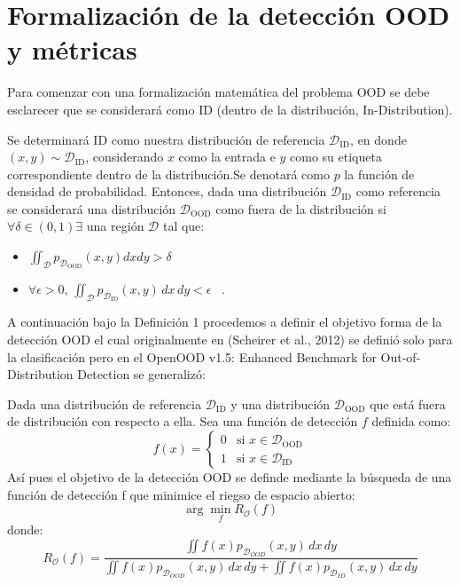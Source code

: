 %

\chapter{Formalización de la detección OOD y métricas}\label{cap:ood-metricas}
Para comenzar con una formalización matemática del problema OOD se debe esclarecer que se considerará como ID (dentro de la distribución, In-Distribution).
\begin{definicion}[ID]\label{def:ID}
    Se determinará $\mathrm{ID}$ como nuestra distribución de referencia $\mathcal{D}_{\mathrm{ID}}$, en donde $(x,y)\sim\mathcal{D}_{\mathrm{ID}}$, considerando $x$ como la entrada e $y$ como su etiqueta correspondiente 
    dentro de la distribución.Se denotará como $p$ la función de densidad de probabilidad. Entonces, dada una distribución  $\mathcal{D}_{\mathrm{ID}}$ como referencia
    se considerará una distribución  $\mathcal{D}_{\mathrm{OOD}}$ como fuera de la distribución si $\forall \delta\in(0,1) \exists$ una región $\mathcal{D}$ tal que:
    \begin{itemize}
        \item   $\iint_{\mathcal{D}}p_{\mathcal{D}_{\mathrm{OOD}}}(x,y)dxdy > \delta$ 
        \item   $\forall\epsilon>0$, $\iint_{\mathcal{D}}p_{\mathcal{D}_{\mathrm{ID}}}(x,y)\,dx\,dy < \epsilon$ ~\cite{openood15}.
    \end{itemize}
\end{definicion}

A continuación bajo la Definición 1 procedemos a definir el objetivo forma de la detección OOD el cual originalmente en (Scheirer et al., 2012)  se definió solo para la clasificación pero 
en el OpenOOD v1.5: Enhanced Benchmark for Out-of-Distribution Detection se generalizó:

\begin{definicion}\label{def:objetivoOOD}
    Dada una distribución de referencia $\mathcal{D}_{\mathrm{ID}}$ y una distribución $\mathcal{D}_{\mathrm{OOD}}$ que está fuera de distribución con respecto a ella. Sea una función de detección $f$ definida como:
    \[
    f(x) = \begin{cases} 
    0 & \text{si } x \in \mathcal{D}_{\mathrm{OOD}} \\ 
    1 & \text{si } x \in \mathcal{D}_{\mathrm{ID}} 
    \end{cases}
    \]
    Así pues el objetivo de la detección OOD se definde mediante la búsqueda de una función de detección f que minimice el riegso de espacio abierto: $$\arg \min_{f} R_{\mathcal{O}}(f)$$ donde: 
    \begin{equation}\label{eq:objetivoOOD}
    R_{\mathcal{O}}(f) = \frac{\iint f(x)p_{\mathcal{D}_{OOD}}(x,y)\,dx\,dy}{\iint f(x)p_{\mathcal{D}_{OOD}}(x,y)\,dx\,dy + \iint f(x)p_{\mathcal{D}_{ID}}(x,y)\,dx\,dy}
\end{equation}
~\cite{openood15}

\end{definicion}

